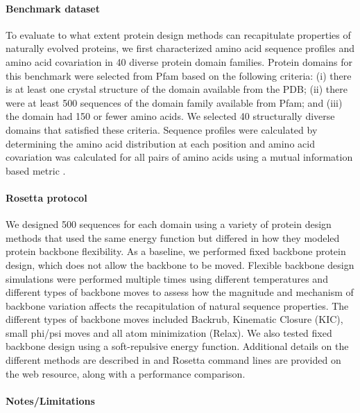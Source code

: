 \paragraph{Benchmark dataset}

To evaluate to what extent protein design methods can recapitulate properties of naturally evolved proteins, we first characterized amino acid sequence profiles and amino acid covariation in 40 diverse protein domain families. Protein domains for this benchmark were selected from Pfam \cite{finn_pfam:_2014} based on the following criteria: (i) there is at least one crystal structure of the domain available from the PDB; (ii) there were at least 500 sequences of the domain family available from Pfam; and (iii) the domain had 150 or fewer amino acids. We selected 40 structurally diverse domains that satisfied these criteria. Sequence profiles were calculated by determining the amino acid distribution at each position and amino acid covariation was calculated for all pairs of amino acids using a mutual information based metric \cite{dickson_identifying_2010}.

\paragraph{Rosetta protocol}

We designed 500 sequences for each domain using a variety of protein design methods that used the same energy function but differed in how they modeled protein backbone flexibility. As a baseline, we performed fixed backbone protein design, which does not allow the backbone to be moved. Flexible backbone design simulations were performed multiple times using different temperatures and different types of backbone moves to assess how the magnitude and mechanism of backbone variation affects the recapitulation of natural sequence properties. The different types of backbone moves included Backrub, Kinematic Closure (KIC), small phi/psi moves and all atom minimization (Relax). We also tested fixed backbone design using a soft-repulsive energy function. Additional details on the different methods are described in \cite{ollikainen_computational_2013} and Rosetta command lines are provided on the web resource, along with a performance comparison.

\paragraph{Notes/Limitations}

